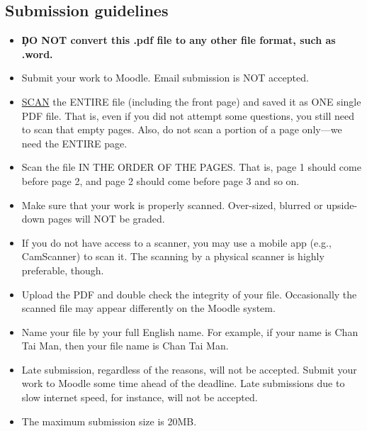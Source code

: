 \documentclass[letterpaper,9pt,addpoints]{exam}
\begin{document}
\subsection*{Submission guidelines}
\begin{itemize}
\item \textbf{\c{DO NOT convert this .pdf file to any other file format, such as .word.}}
\item Submit your work to Moodle. Email submission is NOT accepted. 
\item \underline{SCAN} the ENTIRE file (including the front page) and saved it as ONE single PDF file. That is, even if you did not attempt some questions, you still need to scan that empty pages. Also, do not scan a portion of a page only---we need the ENTIRE page. 
\item Scan the file IN THE ORDER OF THE PAGES. That is, page 1 should come before page 2, and page 2 should come before page 3 and so on. 
\item Make sure that your work is properly scanned. Over-sized, blurred or upside-down pages will NOT be graded.
\item If you do not have access to a scanner, you may use a mobile app (e.g., CamScanner) to scan it. The scanning by a physical scanner is highly preferable, though.  

\item Upload the PDF and double check the integrity of your file. Occasionally the scanned file may appear differently on the Moodle system.
\item Name your file by your full English name. For example, if your name is Chan Tai Man, then your file name is Chan Tai Man.
\item Late submission, regardless of the reasons, will not be accepted. Submit your work to Moodle some time ahead of the deadline. Late submissions due to slow internet speed, for instance, will not be accepted.
\item The maximum submission size is 20MB.
\end{itemize}
\end{document}
